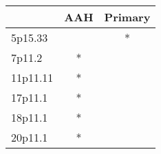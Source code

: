 \begin{tabular}{lcc}
\toprule
{} & AAH & Primary \\
\midrule
5p15.33  &     &       * \\
7p11.2   &   * &         \\
11p11.11 &   * &         \\
17p11.1  &   * &         \\
18p11.1  &   * &         \\
20p11.1  &   * &         \\
\bottomrule
\end{tabular}
